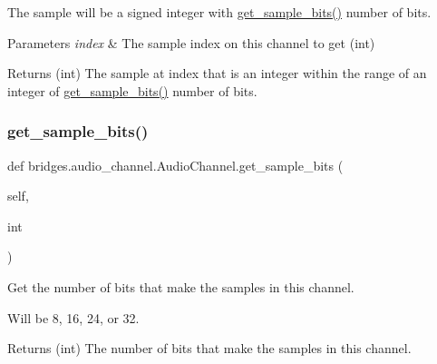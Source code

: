 The sample will be a signed integer with \hyperlink{classbridges_1_1audio__channel_1_1_audio_channel_ae9b2e6e0f5aaebc5adc21815f4fe2f9a}{get\+\_\+sample\+\_\+bits()} number of bits.


\begin{DoxyParams}{Parameters}
{\em index} & The sample index on this channel to get (int) \\
\hline
\end{DoxyParams}
\begin{DoxyReturn}{Returns}
(int) The sample at index that is an integer within the range of an integer of \hyperlink{classbridges_1_1audio__channel_1_1_audio_channel_ae9b2e6e0f5aaebc5adc21815f4fe2f9a}{get\+\_\+sample\+\_\+bits()} number of bits. 
\end{DoxyReturn}
\mbox{\label{classbridges_1_1audio__channel_1_1_audio_channel_ae9b2e6e0f5aaebc5adc21815f4fe2f9a}} 
\subsubsection{\texorpdfstring{get\+\_\+sample\+\_\+bits()}{get\_sample\_bits()}}
{\footnotesize\ttfamily def bridges.\+audio\+\_\+channel.\+Audio\+Channel.\+get\+\_\+sample\+\_\+bits (\begin{DoxyParamCaption}\item[{}]{self,  }\item[{}]{int }\end{DoxyParamCaption})}



Get the number of bits that make the samples in this channel. 

Will be 8, 16, 24, or 32. \begin{DoxyReturn}{Returns}
(int) The number of bits that make the samples in this channel. 
\end{DoxyReturn}
\mbox{\label{classbridges_1_1audio__channel_1_1_audio_channel_a5d4780923b9c11029a1d6847db5480d2}} 

